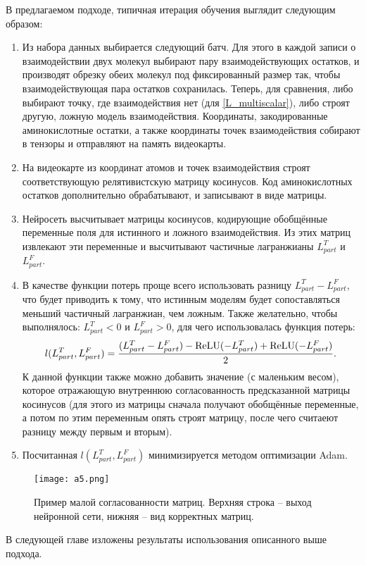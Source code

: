 В предлагаемом подходе, типичная итерация обучения выглядит следующим образом: 
\begin{enumerate}
\item Из набора данных выбирается следующий батч. Для этого в каждой записи о взаимодействии двух молекул выбирают пару взаимодействующих остатков, и производят обрезку обеих молекул под фиксированный размер так, чтобы взаимодействующая пара остатков сохранилась. Теперь, для сравнения, либо выбирают точку, где взаимодействия нет (для \ref{L_multiscalar}), либо строят другую, ложную модель взаимодействия. Координаты, закодированные аминокислотные остатки, а также координаты точек взаимодействия собирают в тензоры и отправляют на память видеокарты.
\item На видеокарте из координат атомов и точек взаимодействия строят соответствующую релятивистскую матрицу косинусов. Код аминокислотных остатков дополнительно обрабатывают, и записывают в виде матрицы.
\item Нейросеть высчитывает матрицы косинусов, кодирующие обобщённые переменные поля для истинного и ложного взаимодействия. Из этих матриц извлекают эти переменные и высчитывают частичные лагранжианы $L^{T}_{part}$ и $L^{F}_{part}$. 
\item В качестве функции потерь проще всего использовать разницу $L^{T}_{part} - L^{F}_{part}$, что будет приводить к тому, что истинным моделям будет сопоставляться меньший частичный лагранжиан, чем ложным. Также желательно, чтобы выполнялось: $L^T_{part} < 0$ и $L^{F}_{part} > 0$, для чего использовалась функция потерь:
\begin{equation}
	l(L^{T}_{part}, L^{F}_{part}) = \frac{(L^{T}_{part} - L^{F}_{part}) - \operatorname{ReLU}(-L^{T}_{part}) + \operatorname{ReLU}(-L^{F}_{part})}{2}.
	\label{loss_function}
\end{equation}
К данной функции также можно добавить значение (с маленьким весом), которое отражающую внутреннюю согласованность предсказанной матрицы косинусов (для этого из матрицы сначала получают обобщённые переменные, а потом по этим переменным опять строят матрицу, после чего считаеют разницу между первым и вторым).
\item Посчитанная $l(L^{T}_{part}, L^{F}_{part})$ минимизируется методом оптимизации Adam.
\end{enumerate}
\begin{figure}[H]
	\centering
	\texttt{[image: a5.png]}
	\caption{Пример малой согласованности матриц. Верхняя строка -- выход нейронной сети, нижняя -- вид корректных матриц.}
	\label{fig_consistency}
\end{figure}

В следующей главе изложены результаты использования описанного выше подхода.
